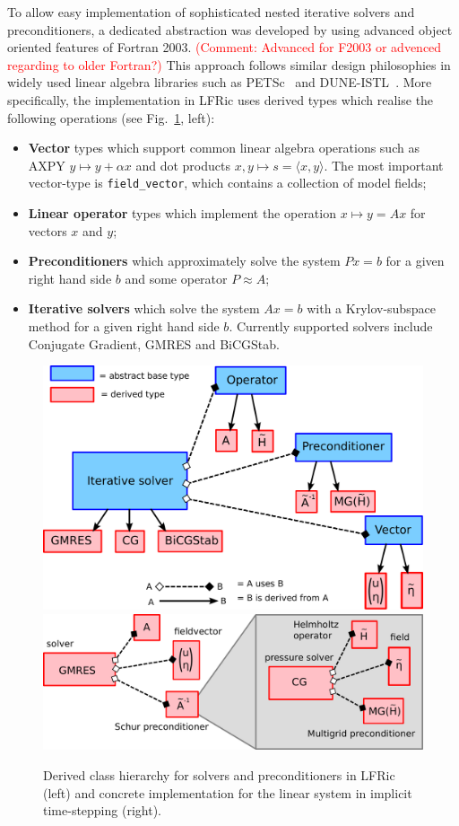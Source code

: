 \documentclass[times]{elsarticle}
\begin{document}
To allow easy implementation of sophisticated nested iterative solvers
and preconditioners, a dedicated abstraction was developed by using
advanced object oriented features of Fortran 2003. 
\textcolor{red}{(Comment: Advanced for F2003 or advenced regarding to older Fortran?)} This approach
follows similar design philosophies in widely used linear algebra
libraries such as PETSc~\cite{Balay1997,Balay2018} and DUNE-ISTL~\cite{Blatt2007}. 
More specifically, the implementation in LFRic uses
derived types which realise the following operations (see
Fig.~\ref{fig:class_hierarchy}, left):
\begin{itemize}
\item \textbf{Vector} types which support common linear algebra
  operations such as AXPY $y\mapsto y+\alpha x$ and dot products
  $x,y\mapsto s = \langle x,y\rangle$. The most important vector-type
  is \texttt{field\_vector}, which contains a collection of model
  fields;
\item \textbf{Linear operator} types which implement the operation $x\mapsto y=Ax$ for vectors $x$ and $y$;
\item \textbf{Preconditioners} which approximately solve the system $Px=b$ for a
  given right hand side $b$ and some operator $P\approx A$;
\item \textbf{Iterative solvers} which solve the system $Ax=b$ with a
  Krylov-subspace method for a given right hand side $b$. Currently
  supported solvers include Conjugate Gradient, GMRES and BiCGStab.
\end{itemize}
\begin{figure}
  \begin{center}
    \includegraphics[width=0.45\linewidth]{class_hierarchy.pdf}
    \hfill
    \includegraphics[width=0.45\linewidth]{class_concrete.pdf}
    \caption{Derived class hierarchy for solvers and preconditioners
      in LFRic (left) and concrete implementation for the linear
      system in implicit time-stepping (right).}
    \label{fig:class_hierarchy}
  \end{center}
\end{figure}
\end{document}
